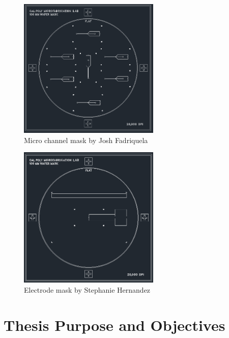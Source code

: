 \begin{figure}[h]
    \centering
    \includegraphics[width=0.6\textwidth]{images/micro_channel_mask.png}
    \caption{Micro channel mask by Josh Fadriquela \cite{fadriquela_design_2009-1}}
    \label{fig:microchannel_mask}
\end{figure}


\begin{figure}[h]
    \centering
    \includegraphics[width=0.6\textwidth]{images/electrode_mask.png}
    \caption{Electrode mask by Stephanie Hernandez \cite{hernandez_single_2009-1}}
    \label{fig:electrode_mask}
\end{figure}

\section[Objectives]{Thesis Purpose and Objectives}

